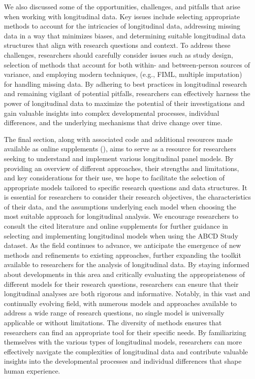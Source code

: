 \documentclass[
  number,
  preprint,
  3p,
  twocolumn]{elsarticle}
\begin{document}
We also discussed some of the opportunities, challenges, and pitfalls
that arise when working with longitudinal data. Key issues include
selecting appropriate methods to account for the intricacies of
longitudinal data, addressing missing data in a way that minimizes
biases, and determining suitable longitudinal data structures that align
with research questions and context. To address these challenges,
researchers should carefully consider issues such as study design,
selection of methods that account for both within- and between-person
sources of variance, and employing modern techniques, (e.g., FIML,
multiple imputation) for handling missing data. By adhering to best
practices in longitudinal research and remaining vigilant of potential
pitfalls, researchers can effectively harness the power of longitudinal
data to maximize the potential of their investigations and gain valuable
insights into complex developmental processes, individual differences,
and the underlying mechanisms that drive change over time.

The final section, along with associated code and additional resources
made available as online supplements (), aims to serve as a resource for
researchers seeking to understand and implement various longitudinal
panel models. By providing an overview of different approaches, their
strengths and limitations, and key considerations for their use, we hope
to facilitate the selection of appropriate models tailored to specific
research questions and data structures. It is essential for researchers
to consider their research objectives, the characteristics of their
data, and the assumptions underlying each model when choosing the most
suitable approach for longitudinal analysis. We encourage researchers to
consult the cited literature and online supplements for further guidance
in selecting and implementing longitudinal models when using the ABCD
Study dataset. As the field continues to advance, we anticipate the
emergence of new methods and refinements to existing approaches, further
expanding the toolkit available to researchers for the analysis of
longitudinal data. By staying informed about developments in this area
and critically evaluating the appropriateness of different models for
their research questions, researchers can ensure that their longitudinal
analyses are both rigorous and informative. Notably, in this vast and
continually evolving field, with numerous models and approaches
available to address a wide range of research questions, no single model
is universally applicable or without limitations. The diversity of
methods ensures that researchers can find an appropriate tool for their
specific needs. By familiarizing themselves with the various types of
longitudinal models, researchers can more effectively navigate the
complexities of longitudinal data and contribute valuable insights into
the developmental processes and individual differences that shape human
experience.

\newpage{}


\renewcommand\refname{Part V: References}
  
\end{document}
